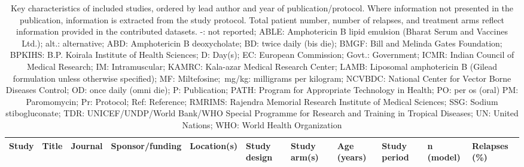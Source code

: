 \begin{ThreePartTable}
  \begin{longtable}[c]{L{1.5cm} L{3.5cm} L{1.3cm} L{2.5cm} L{2.5cm} L{2.5cm} L{3cm} L{1.5cm} L{1cm} L{1cm} L{1.3cm}}
    \caption{Key characteristics of included studies, ordered by lead author and year of publication/protocol. Where information not presented in the publication, information is extracted from the study protocol. Total patient number, number of relapses, and treatment arms reflect information provided in the contributed datasets. -: not reported; ABLE: Amphotericin B lipid emulsion (Bharat Serum and Vaccines Ltd.); alt.: alternative; ABD: Amphotericin B deoxycholate; BD: twice daily (bis die); BMGF: Bill and Melinda Gates Foundation; BPKIHS: B.P. Koirala Institute of Health Sciences; D: Day(s); EC: European Commission; Govt.: Government; ICMR: Indian Council of Medical Research; IM: Intramuscular; KAMRC: Kala-azar Medical Research Center; LAMB: Liposomal amphotericin B (Gilead formulation unless otherwise specified); MF: Miltefosine;~mg/kg: milligrams per kilogram; NCVBDC: National Center for Vector Borne Diseases Control; OD: once daily (omni die); P: Publication; PATH: Program for Appropriate Technology in Health; PO: per os (oral) PM: Paromomycin; Pr: Protocol; Ref: Reference; RMRIMS: Rajendra Memorial Research Institute of Medical Sciences; SSG: Sodium stibogluconate; TDR: UNICEF/UNDP/World Bank/WHO Special Programme for Research and Training in Tropical Diseases; UN: United Nations; WHO: World Health Organization\label{tab:isc_study}} \\
    \toprule
    Study                                  & Title                                                                                                                                                                                                                       & Journal                  & Sponsor/funding                                                                      & Location(s)                                       & Study design                                                                       & Study arm(s)                                                                                                                                                                                                          & Age (years) & Study period & n (model)    & Relapses (\%)                                                                                                                                                                                                                                                                                                                                                                                                                                                                                                                                                                                  \\ \midrule
    \endfirsthead


\end{longtable}
\end{ThreePartTable}
